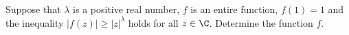 Suppose that $\lambda$ is a positive real number, $f$ is an entire
function, $f(1)=1$ and the inequality $|f(z)|\geq |z|^{\lambda}$
holds for all $z\in \C$. Determine the function $f$.
